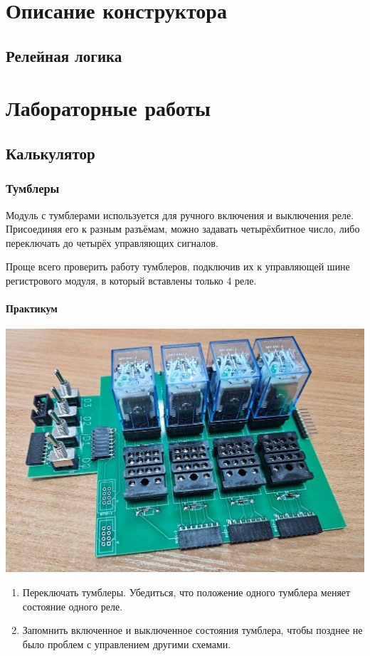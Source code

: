\documentclass{book}
\begin{document}
\tableofcontents

\part{Описание конструктора}

\chapter{Релейная логика}

\part{Лабораторные работы}

\chapter{Калькулятор}

\section{Тумблеры}

Модуль с тумблерами используется для ручного включения и выключения реле.
Присоединяя его к разным разъёмам, можно задавать четырёхбитное число,
либо переключать до четырёх управляющих сигналов.

Проще всего проверить работу тумблеров, подключив их к управляющей шине
регистрового модуля, в который вставлены только $4$ реле.

\subsection{Практикум}

\includegraphics[width=0.5\columnwidth]{photo/switches.jpg}

\begin{enumerate}
    \item Переключать тумблеры. Убедиться, что положение одного тумблера меняет состояние одного реле.
    \item Запомнить включенное и выключенное состояния тумблера, чтобы позднее не было проблем с управлением другими схемами.
\end{enumerate}
\end{document}
